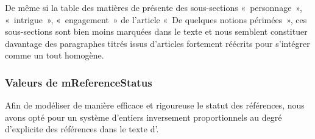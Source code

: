 \documentclass[12pt, a4paper]{article}
\begin{document}
De même si la table des matières de \punr{} présente des sous-sections «~personnage~», «~intrigue~», «~engagement~» de l'article «~De quelques notions périmées~», ces sous-sections sont bien moins marquées dans le texte et nous semblent constituer davantage des paragraphes titrés issus d'articles fortement réécrits pour s'intégrer comme un tout homogène.



\subsubsection{Valeurs de mReferenceStatus}
Afin de modéliser de manière efficace et rigoureuse le statut des références, nous avons opté pour un système d'entiers inversement proportionnels au degré d'explicite des références dans le texte d'\robbe.
\end{document}
